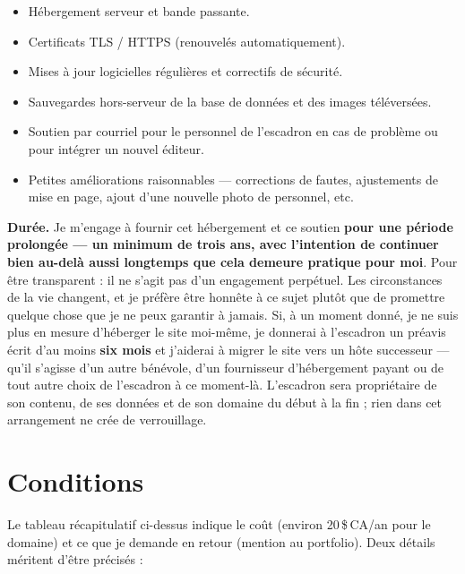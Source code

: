 \documentclass[11pt,letterpaper]{article}
\begin{document}
\begin{itemize}[leftmargin=1.4em,itemsep=0.25em]
  \item Hébergement serveur et bande passante.
  \item Certificats TLS / HTTPS (renouvelés automatiquement).
  \item Mises à jour logicielles régulières et correctifs de sécurité.
  \item Sauvegardes hors-serveur de la base de données et des images téléversées.
  \item Soutien par courriel pour le personnel de l'escadron en cas de problème ou pour intégrer un nouvel éditeur.
  \item Petites améliorations raisonnables --- corrections de fautes, ajustements de mise en page, ajout d'une nouvelle photo de personnel, etc.
\end{itemize}

\textbf{Durée.} Je m'engage à fournir cet hébergement et ce soutien \textbf{pour une période prolongée --- un minimum de trois ans, avec l'intention de continuer bien au-delà aussi longtemps que cela demeure pratique pour moi}. Pour être transparent : il ne s'agit pas d'un engagement perpétuel. Les circonstances de la vie changent, et je préfère être honnête à ce sujet plutôt que de promettre quelque chose que je ne peux garantir à jamais. Si, à un moment donné, je ne suis plus en mesure d'héberger le site moi-même, je donnerai à l'escadron un préavis écrit d'au moins \textbf{six mois} et j'aiderai à migrer le site vers un hôte successeur --- qu'il s'agisse d'un autre bénévole, d'un fournisseur d'hébergement payant ou de tout autre choix de l'escadron à ce moment-là. L'escadron sera propriétaire de son contenu, de ses données et de son domaine du début à la fin ; rien dans cet arrangement ne crée de verrouillage.

\section{Conditions}

Le tableau récapitulatif ci-dessus indique le coût (environ 20\,\$\,CA/an pour le domaine) et ce que je demande en retour (mention au portfolio). Deux détails méritent d'être précisés :
\end{document}

